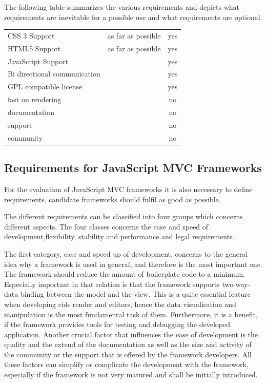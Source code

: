 The following table summarizes the various requirements and depicts what requirements are inevitable for a possible use and what requirements are optional.

\begin{minipage}{\linewidth}
\centering
 \label{tab:req_browser_comp}
\begin{tabulary}{\textwidth}{|l|C|c|}
 \hline 
{}
   &  &  \tabularnewline
 \hline
CSS 3 Support & as far as possible & yes \\
HTML5 Support & as far as possible & yes  \\
JavaScript Support & & yes \\
 Bi directional communication & & yes \\
GPL compatible license & & yes \\ \hline
fast on rendering & & no\\
documentation & & no\\
support & & no \\
community & &no \\
 \hline 
 \end{tabulary}
 \end{minipage}

\subsection{Requirements for JavaScript MVC Frameworks}

For the evaluation of JavaScript MVC frameworks it is also necessary to define requirements, candidate frameworks should fulfil as good as possible.

The different requirements can be classified into four groups which concerns different aspects.
The four classes concerns the ease and speed of development,flexibility, stability and performance and legal requirements.

The first category, ease and speed up of development, concerns to the general idea why a framework is used in general, and therefore is the most important one.
The framework should reduce the amount of boilerplate code to a minimum.
Especially important in that relation is that the framework supports two-way-data binding between the model and the view.
This is a quite essential feature when developing cids render and editors, hence the data visualisation and manipulation is the most fundamental task of them.
Furthermore, it is a benefit, if the framework provides tools for testing and debugging the developed application.
Another crucial factor that influences the ease of development is the quality and the  extend of the documentation as well as the size and activity of the community or the support that is offered by the framework developers.
All these factors can simplify or complicate the development with the framework, especially if the framework is not very matured and shall be initially introduced.

